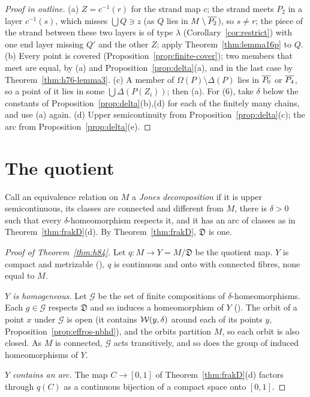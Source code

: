 \begin{proof}[Proof in outline]
(a) $Z=c^{-1}(r)$ for the strand map $c$; the strand meets $P_2$ in a layer $c^{-1}(s)$, which misses $\bigcup Q\ni z$ (as $Q$ lies in
$M\setminus\overline{P_2}$), so $s\ne r$; the piece of the strand between these two layers is of type $\lambda$
(Corollary~\ref{cor:restrict}) with one end layer missing $Q'$ and the other $Z$; apply Theorem~\ref{thm:lemma16p} to $Q$.
(b) Every point is covered (Proposition~\ref{prop:finite-cover}); two members that meet are equal, by (a) and
Proposition~\ref{prop:delta}(a), and in the last case by Theorem~\ref{thm:h76-lemma3}. (c) A member of $\Omega(P)\setminus\Delta(P)$ lies in
$\overline{P_0}$ or $\overline{P_4}$, so a point of it lies in some $\bigcup\Delta(P(Z_i))$; then (a). For (6), take $\delta$ below the constants of
Proposition~\ref{prop:delta}(b),(d) for each of the finitely many chains, and use (a) again. (d) Upper semicontinuity from
Proposition~\ref{prop:delta}(c); the arc from Proposition~\ref{prop:delta}(e).
\end{proof}


\section{The quotient}

Call an equivalence relation on $M$ a \emph{Jones decomposition} if it is upper semicontinuous, its classes are connected and different
from $M$, there is $\delta>0$ such that every $\delta$-homeomorphism respects it, and it has an arc of classes as in
Theorem~\ref{thm:frakD}(d). By Theorem~\ref{thm:frakD}, $\mathfrak D$ is one.


\begin{proof}[Proof of Theorem~\ref{thm:h84}]
Let $q\colon M\to Y=M/\mathfrak D$ be the quotient map. $Y$ is compact and metrizable (), $q$ is continuous and onto
with connected fibres, none equal to $M$.

\emph{$Y$ is homogeneous.} Let $\mathcal G$ be the set of finite compositions of $\delta$-homeomorphisms. Each $g\in\mathcal G$ respects $\mathfrak
D$ and so induces a homeomorphism of $Y$ (). The orbit of a point $x$ under $\mathcal G$ is open (it contains
$\mathcal{W}(y,\delta)$ around each of its points $y$, Proposition~\ref{prop:effros-nbhd}), and the orbits partition $M$, so each orbit is also
closed. As $M$ is connected, $\mathcal G$ acts transitively, and so does the group of induced homeomorphisms of $Y$.

\emph{$Y$ contains an arc.} The map $C\to[0,1]$ of Theorem~\ref{thm:frakD}(d) factors through $q(C)$ as a continuous bijection of a
compact space onto $[0,1]$.
\end{proof}


